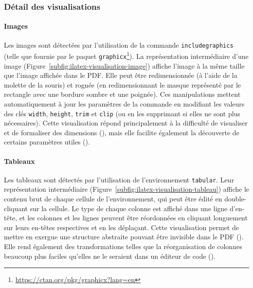 \subsubsection{Détail des visualisations}

\paragraph{Images}
Les images sont détectées par l'utilisation de la commande \texttt{includegraphics} (telle que fournie par le paquet \texttt{graphicx}\footnote{\url{https://ctan.org/pkg/graphicx?lang=en}}).
La représentation intermédiaire d'une image ({Figure~\ref{subfig:ilatex-visualisation-image}}) affiche l'image à la même taille que l'image affichée dans le PDF.
Elle peut être redimensionnée (à l'aide de la molette de la souris) et rognée (en redimensionnant le masque représenté par le rectangle avec une bordure sombre et une poignée).
Ces manipulations mettent automatiquement à jour les paramètres de la commande en modifiant les valeurs des clés \texttt{width}, \texttt{height}, \texttt{trim} et \texttt{clip} (ou en les supprimant si elles ne sont plus nécessaires).
Cette visualisation répond principalement à la difficulté de visualiser et de formaliser des dimensions (), mais elle facilite également la découverte de certains paramètres utiles ().

\paragraph{Tableaux}
Les tableaux sont détectés par l'utilisation de l'environnement \texttt{tabular}.
Leur représentation intermédiaire ({Figure~\ref{subfig:ilatex-visualisation-tableau}}) affiche le contenu brut de chaque \og{} cellule \fg de l'environnement, qui peut être édité en double-cliquant sur la cellule.
Le type de chaque colonne est affiché dans une ligne d'en-tête, et les colonnes et les lignes peuvent être réordonnées en cliquant longuement sur leurs en-têtes respectives et en les déplaçant.
Cette visualisation permet de mettre en exergue une structure abstraite pouvant être invisible dans le PDF ().
Elle rend également des transformations telles que la réorganisation de colonnes beaucoup plus faciles qu'elles ne le seraient dans un éditeur de code ().

